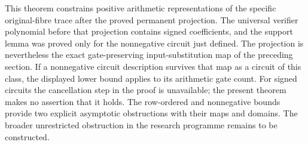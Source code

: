 This theorem constrains positive arithmetic representations of the
specific original-fibre trace after the proved permanent projection.
The universal verifier polynomial before that projection contains
signed coefficients, and the support lemma was proved only for the
nonnegative circuit just defined. The projection is nevertheless the
exact gate-preserving input-substitution map of the preceding section.
If a nonnegative circuit description survives that map as a circuit
of this class, the displayed lower bound applies to its arithmetic
gate count. For signed circuits the cancellation step in the proof
is unavailable; the present theorem makes no assertion that it holds.
The row-ordered and nonnegative bounds provide two explicit
asymptotic obstructions with their maps and domains. The broader
unrestricted obstruction in the research programme remains to be
constructed.
